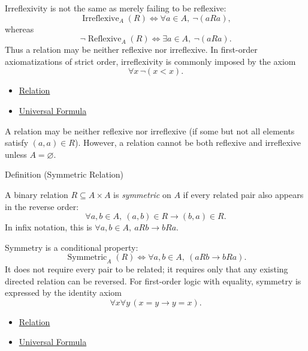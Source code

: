 \begin{remark*}
Irreflexivity is not the same as merely failing to be reflexive:
\[
  \operatorname{Irreflexive}_A(R)
  \iff
  \forall a\in A,\ \neg(aRa),
\]
whereas
\[
  \neg\operatorname{Reflexive}_A(R)
  \iff
  \exists a\in A,\ \neg(aRa).
\]
Thus a relation may be neither reflexive nor irreflexive. In first-order
axiomatizations of strict order, irreflexivity is commonly imposed by the
axiom
\[
  \forall x\,\neg(x<x).
\]
\end{remark*}

\begin{dependencies}
\begin{itemize}
  \item \hyperref[def:relation]{Relation}
  \item \hyperref[def:universal-q]{Universal Formula}
\end{itemize}
\end{dependencies}

\begin{remark*}
A relation may be neither reflexive nor irreflexive (if some but not all
elements satisfy $(a,a)\in R$). However, a relation cannot be both reflexive
and irreflexive unless $A = \varnothing$.
\end{remark*}

\begin{definitionbox}{Definition (Symmetric Relation)}
\begin{definition}\label{def:symmetric}
A binary relation $R\subseteq A\times A$ is \emph{symmetric} on $A$ if every
related pair also appears in the reverse order:
\[
  \forall a,b\in A,\ (a,b)\in R \rightarrow (b,a)\in R.
\]
In infix notation, this is $\forall a,b\in A,\ aRb\rightarrow bRa$.
\end{definition}
\end{definitionbox}


\begin{remark*}
Symmetry is a conditional property:
\[
  \operatorname{Symmetric}_A(R)
  \iff
  \forall a,b\in A,\ (aRb\rightarrow bRa).
\]
It does not require every pair to be related; it requires only that any
existing directed relation can be reversed. For first-order logic with
equality, symmetry is expressed by the identity axiom
\[
  \forall x\forall y\,(x=y\rightarrow y=x).
\]
\end{remark*}

\begin{dependencies}
\begin{itemize}
  \item \hyperref[def:relation]{Relation}
  \item \hyperref[def:universal-q]{Universal Formula}
\end{itemize}
\end{dependencies}

